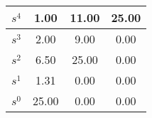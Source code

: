 \begin{large}\begin{tabular}{|l|c|c|c|}
\hline
\textbf{$s^4$}&1.00&11.00&25.00\\\hline
\textbf{$s^3$}&2.00&9.00&0.00\\\hline
\textbf{$s^2$}&6.50&25.00&0.00\\\hline
\textbf{$s^1$}&1.31&0.00&0.00\\\hline
\textbf{$s^0$}&25.00&0.00&0.00\\\hline
\end{tabular}
\end{large}